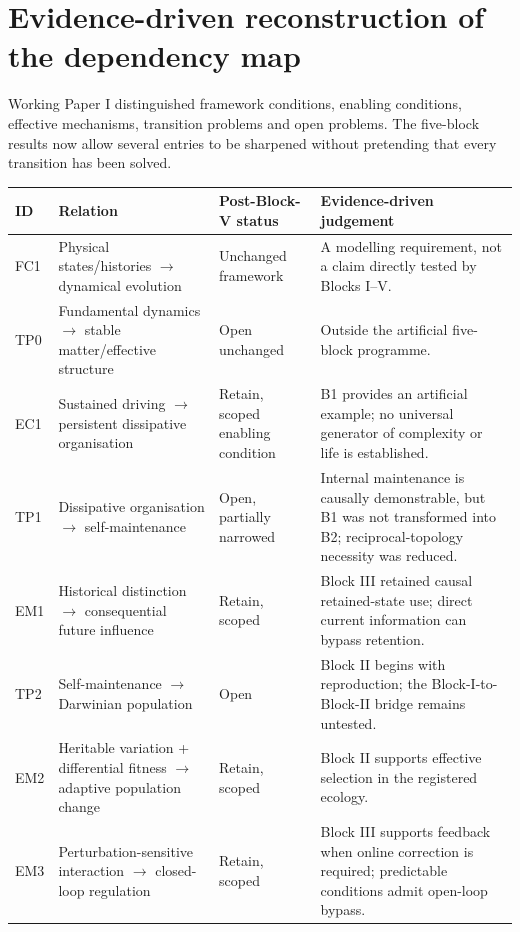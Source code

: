 \documentclass[11pt,a4paper]{article}
\begin{document}
\section{Evidence-driven reconstruction of the dependency map}

Working Paper I distinguished framework conditions, enabling conditions, effective mechanisms, transition problems and open problems. The five-block results now allow several entries to be sharpened without pretending that every transition has been solved.

\small
\begin{longtable}{p{.08\linewidth}p{.28\linewidth}p{.20\linewidth}p{.34\linewidth}}
\toprule
ID & Relation & Post-Block-V status & Evidence-driven judgement\\
\midrule
\endhead
FC1 & Physical states/histories $\rightarrow$ dynamical evolution & Unchanged framework & A modelling requirement, not a claim directly tested by Blocks I--V.\\
TP0 & Fundamental dynamics $\rightarrow$ stable matter/effective structure & Open unchanged & Outside the artificial five-block programme.\\
EC1 & Sustained driving $\rightarrow$ persistent dissipative organisation & Retain, scoped enabling condition & B1 provides an artificial example; no universal generator of complexity or life is established.\\
TP1 & Dissipative organisation $\rightarrow$ self-maintenance & Open, partially narrowed & Internal maintenance is causally demonstrable, but B1 was not transformed into B2; reciprocal-topology necessity was reduced.\\
EM1 & Historical distinction $\rightarrow$ consequential future influence & Retain, scoped & Block III retained causal retained-state use; direct current information can bypass retention.\\
TP2 & Self-maintenance $\rightarrow$ Darwinian population & Open & Block II begins with reproduction; the Block-I-to-Block-II bridge remains untested.\\
EM2 & Heritable variation + differential fitness $\rightarrow$ adaptive population change & Retain, scoped & Block II supports effective selection in the registered ecology.\\
EM3 & Perturbation-sensitive interaction $\rightarrow$ closed-loop regulation & Retain, scoped & Block III supports feedback when online correction is required; predictable conditions admit open-loop bypass.\\

\end{longtable}
\end{document}
